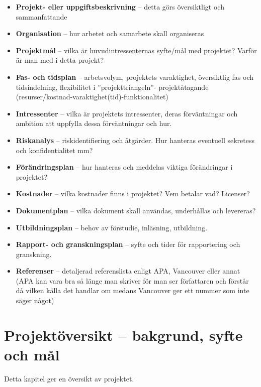 \documentclass[11pt]{article}
\begin{document}
\begin{itemize}
\item \textbf{Projekt- eller uppgiftsbeskrivning} -- detta görs översiktligt och
sammanfattande

\item \textbf{Organisation} -- hur arbetet och samarbete skall organiseras

\item \textbf{Projektmål} -- vilka är huvudintressenternas syfte/mål med
projektet? Varför är man med i detta projekt?

\item \textbf{Fas- och tidsplan} -- arbetsvolym, projektets varaktighet,
översiktlig fas och tidsindelning, flexibilitet i ”projekttriangeln”-
projektåtagande (resurser/kostnad-varaktighet(tid)-funktionalitet)

\item \textbf{Intressenter} -- vilka är projektets intressenter, deras
förväntningar och ambition att uppfylla dessa förväntningar och hur.

\item \textbf{Riskanalys} -- riskidentifiering och åtgärder. Hur hanteras
eventuell sekretess och konfidentialitet mm?

\item \textbf{Förändringsplan} -- hur hanteras och meddelas viktiga förändringar i
projektet?

\item \textbf{Kostnader} -- vilka kostnader finns i projektet? Vem betalar vad?
Licenser?

\item \textbf{Dokumentplan} -- vilka dokument skall användas, underhållas och
levereras?

\item \textbf{Utbildningsplan} -- behov av förstudie, inläsning, utbildning.

\item \textbf{Rapport- och granskningsplan} -- syfte och tider för rapportering
och granskning.

\item \textbf{Referenser} -- detaljerad referenslista enligt APA, Vancouver eller
annat (APA kan vara bra så länge man skriver för man ser författaren
och förstår då vilken källa det handlar om medans Vancouver ger ett
nummer som inte säger något)
\end{itemize}

\section{Projektöversikt -- bakgrund, syfte och mål}
\label{sec:org92adba0}
Detta kapitel ger en översikt av projektet.
\end{document}
